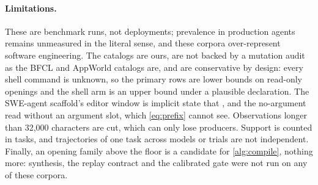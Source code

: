 \paragraph{Limitations.}
These are benchmark runs, not deployments; prevalence in production agents
remains unmeasured in the literal sense, and these corpora over-represent
software engineering. The catalogs are ours, are not backed by a mutation
audit as the BFCL and AppWorld catalogs are, and are conservative by design:
every shell command is unknown, so the primary rows are lower bounds on
read-only openings and the shell arm is an upper bound under a plausible
declaration. The SWE-agent scaffold's editor window is implicit state that
,  and the no-argument  read without
an argument slot, which \cref{eq:prefix} cannot see. Observations longer than
32{,}000 characters are cut, which can only lose producers. Support is counted
in tasks, and trajectories of one task across models or trials are not
independent. Finally, an opening family above the floor is a candidate for
\cref{alg:compile}, nothing more: synthesis, the replay contract and the
calibrated gate were not run on any of these corpora.
